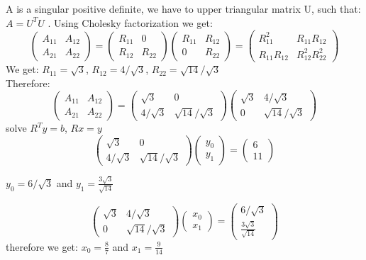 \documentclass[12pt, oneside]{article}   	%
\begin{document}
\begin{enumerate}
	
	A is a singular positive definite, we have to upper triangular matrix U, such that: $A=U^TU$ . Using Cholesky factorization we get:\\
	$$\left(\begin{array}{cc}A_{11}&A_{12}\\A_{21}&A_{22}\end{array}\right) =\left(\begin{array}{cc}R_{11}&0\\R_{12}&R_{22}\end{array}\right) \left(\begin{array}{cc}R_{11}&R_{12}\\0&R_{22}\end{array}\right)= \left(\begin{array}{cc}R_{11}^2&R_{11}R_{12}\\R_{11}R_{12}&R_{12}^2 R_{22}^2\end{array}\right) $$
	We get:  $R_{11}= \sqrt{3}$, $R_{12}= 4/ \sqrt{3}$, $R_{22}= \sqrt{14}/ \sqrt{3}$\\
	Therefore:
	$$\left(\begin{array}{cc}A_{11}&A_{12}\\A_{21}&A_{22}\end{array}\right) =\left(\begin{array}{cc}\sqrt{3}&0\\4/ \sqrt{3}&\sqrt{14}/ \sqrt{3}\end{array}\right) \left(\begin{array}{cc}\sqrt{3}&4/ \sqrt{3}\\0&\sqrt{14}/ \sqrt{3}\end{array}\right)$$
	solve $R^Ty=b$,
     $Rx=y$	
	$$\left(\begin{array}{cc}\sqrt{3}&0\\4/ \sqrt{3}&\sqrt{14}/ \sqrt{3}\end{array}\right)\left(\begin{array}{c}y_0\\y_1\end{array}\right)=\left(\begin{array}{c}6\\11\end{array}\right)$$
	
	$y_0=6/ \sqrt{3}$ and  $y_1= \frac{3\sqrt{3}}{\sqrt{14}} $
	
	$$\left(\begin{array}{cc}\sqrt{3}&4/ \sqrt{3}\\0&\sqrt{14}/ \sqrt{3}\end{array}\right)\left(\begin{array}{c}x_0\\x_1\end{array}\right)=\left(\begin{array}{c}6/ \sqrt{3}\\\frac{3\sqrt{3}}{\sqrt{14}} \end{array}\right)$$
	therefore we get: $x_0=\frac{8}{7}$ and  $x_1= \frac{9}{14} $
	

\end{enumerate}
\end{document}
